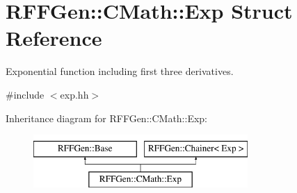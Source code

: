 \hypertarget{structRFFGen_1_1CMath_1_1Exp}{\section{R\-F\-F\-Gen\-:\-:C\-Math\-:\-:Exp Struct Reference}
\label{structRFFGen_1_1CMath_1_1Exp}
}


Exponential function including first three derivatives.  




{\ttfamily \#include $<$exp.\-hh$>$}

Inheritance diagram for R\-F\-F\-Gen\-:\-:C\-Math\-:\-:Exp\-:\begin{figure}[H]
\begin{center}
\leavevmode
\includegraphics[height=2.000000cm]{structRFFGen_1_1CMath_1_1Exp}
\end{center}
\end{figure}
